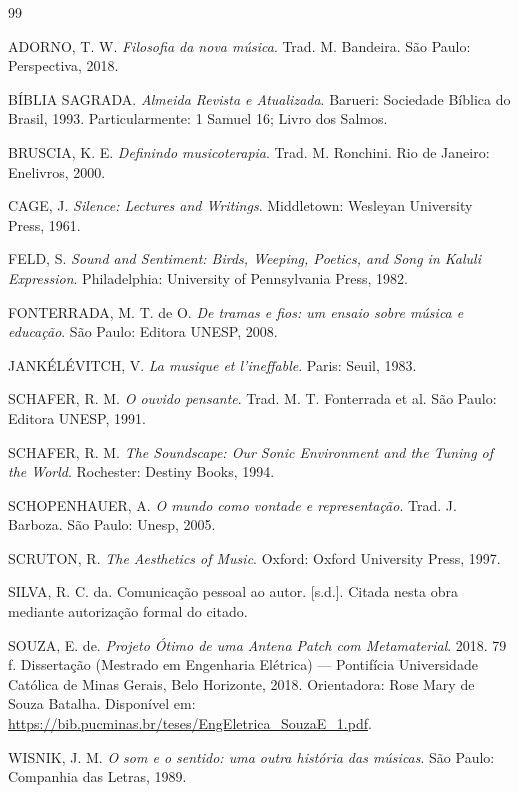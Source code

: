 \documentclass[12pt,a4paper]{article}
\begin{document}
\renewcommand{\refname}{Referências}
\begin{thebibliography}{99}

ADORNO, T. W. \textit{Filosofia da nova música}. Trad. M. Bandeira. São Paulo: Perspectiva, 2018.

BÍBLIA SAGRADA. \textit{Almeida Revista e Atualizada}. Barueri: Sociedade Bíblica do Brasil, 1993. Particularmente: 1 Samuel 16; Livro dos Salmos.

BRUSCIA, K. E. \textit{Definindo musicoterapia}. Trad. M. Ronchini. Rio de Janeiro: Enelivros, 2000.

CAGE, J. \textit{Silence: Lectures and Writings}. Middletown: Wesleyan University Press, 1961.

FELD, S. \textit{Sound and Sentiment: Birds, Weeping, Poetics, and Song in Kaluli Expression}. Philadelphia: University of Pennsylvania Press, 1982.

FONTERRADA, M. T. de O. \textit{De tramas e fios: um ensaio sobre música e educação}. São Paulo: Editora UNESP, 2008.

JANKÉLÉVITCH, V. \textit{La musique et l'ineffable}. Paris: Seuil, 1983.

SCHAFER, R. M. \textit{O ouvido pensante}. Trad. M. T. Fonterrada et al. São Paulo: Editora UNESP, 1991.

SCHAFER, R. M. \textit{The Soundscape: Our Sonic Environment and the Tuning of the World}. Rochester: Destiny Books, 1994.

SCHOPENHAUER, A. \textit{O mundo como vontade e representação}. Trad. J. Barboza. São Paulo: Unesp, 2005.

SCRUTON, R. \textit{The Aesthetics of Music}. Oxford: Oxford University Press, 1997.

SILVA, R. C. da. Comunicação pessoal ao autor. [s.d.]. Citada nesta obra mediante autorização formal do citado.

SOUZA, E. de. \textit{Projeto Ótimo de uma Antena Patch com Metamaterial}. 2018. 79 f. Dissertação (Mestrado em Engenharia Elétrica) --- Pontifícia Universidade Católica de Minas Gerais, Belo Horizonte, 2018. Orientadora: Rose Mary de Souza Batalha. Disponível em: \url{https://bib.pucminas.br/teses/EngEletrica_SouzaE_1.pdf}.

WISNIK, J. M. \textit{O som e o sentido: uma outra história das músicas}. São Paulo: Companhia das Letras, 1989.

\end{thebibliography}
\end{document}
